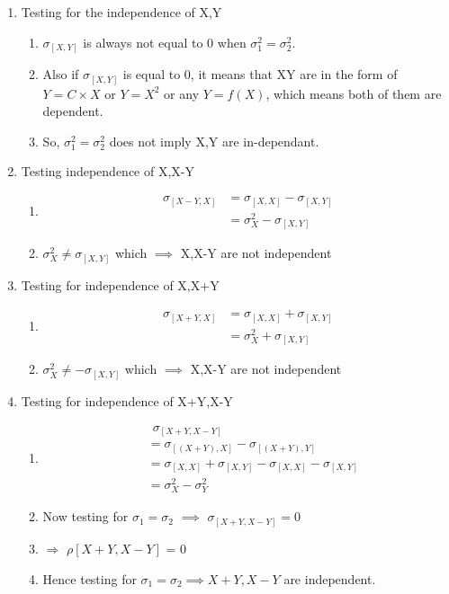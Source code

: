 \documentclass{article}
\begin{document}
\begin{enumerate}
\item \large{Testing for the independence of X,Y}
\begin{enumerate}
\item $\sigma_{[X,Y]}$ is always not equal to 0 when $\sigma_1^2 = \sigma_2^2$.
\item Also if $\sigma_{[X,Y]}$ is equal to 0, it means that XY are in the form of $Y = C\times X$ or $Y=X^2$ or any $Y = f(X)$, which means both of them are dependent.
\item So, $\sigma_1^2 = \sigma_2^2$ does not imply X,Y are in-dependant.\\
\end{enumerate}

\item \large{Testing independence of X,X-Y}
\begin{enumerate}
\item \begin{align*}
    \sigma_{[X-Y,X]} &= \sigma_{[X,X]} - \sigma_{[X,Y]}\\
                     &= \sigma_{X}^2 - \sigma_{[X,Y]}
\end{align*}
\item $\sigma_{X}^2 \neq \sigma_{[X,Y]}$ which $\implies$ X,X-Y are not independent\\
\end{enumerate}

\item \large Testing for independence of X,X+Y
\begin{enumerate}
\item \begin{align*}
   \sigma_{[X+Y,X]} &= \sigma_{[X,X]} + \sigma_{[X,Y]}\\
                     &= \sigma_{X}^2 + \sigma_{[X,Y]}
\end{align*}
\item $\sigma_{X}^2 \neq -\sigma_{[X,Y]}$ which $\implies$ X,X-Y are not independent\\
\end{enumerate}
\item \large{Testing for independence of X+Y,X-Y}
\begin{enumerate}
\item \begin{align*}
& \hspace{5pt} \sigma_{[X+Y, X-Y]}\\
&= \sigma_{[(X+Y), X]}- \sigma_{[(X+Y), Y]} \\
&= \sigma_{[X,X]} + \sigma_{[X,Y]} - \sigma_{[X,X]} - \sigma_{[X,Y]}  \\
&= \sigma_X^2 - \sigma_Y^2
\end{align*}

\item Now testing for $\sigma_1 = \sigma_2 $ $\implies$ $\sigma_{[X+Y,X-Y]}= 0$
\item $\Rightarrow$ $\rho[X+Y,X-Y]$ =  0
\item Hence testing for   $\sigma_1 = \sigma_2 \implies X+Y, X-Y$ are independent.
\end{enumerate}
\end{enumerate}
\end{document}
